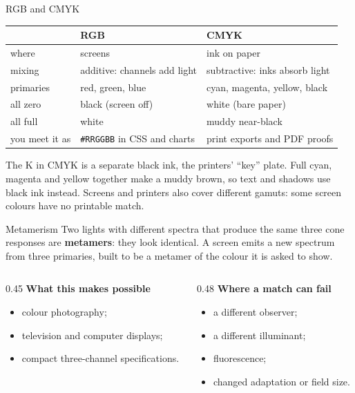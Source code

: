 \documentclass[aspectratio=169,11pt]{beamer}
\begin{document}
\begin{frame}{RGB and CMYK}
  \small
  \renewcommand{\arraystretch}{1.3}
  \begin{tabular}{@{}lll@{}}
    \toprule
     & \textbf{RGB} & \textbf{CMYK} \\
    \midrule
    where & screens & ink on paper \\
    mixing & additive: channels add light & subtractive: inks absorb light \\
    primaries & red, green, blue & cyan, magenta, yellow, black \\
    all zero & black (screen off) & white (bare paper) \\
    all full & white & muddy near-black \\
    you meet it as & \texttt{\#RRGGBB} in CSS and charts & print exports and PDF proofs \\
    \bottomrule
  \end{tabular}
  \vspace{0.8em}

  The K in CMYK is a separate black ink, the printers' ``key'' plate.
  Full cyan, magenta and yellow together make a muddy brown, so text and
  shadows use black ink instead. Screens and printers also cover
  different gamuts: some screen colours have no printable match.
\end{frame}

\begin{frame}{Metamerism}
  \small
  Two lights with different spectra that produce the same three cone
  responses are \textbf{metamers}: they look identical. A screen emits a
  new spectrum from three primaries, built to be a metamer of the colour
  it is asked to show.
  \vspace{0.8em}
  \begin{columns}[T]
    \begin{column}{0.45\textwidth}
      \textbf{What this makes possible}
      \begin{itemize}
        \item colour photography;
        \item television and computer displays;
        \item compact three-channel specifications.
      \end{itemize}
    \end{column}
    \begin{column}{0.48\textwidth}
      \textbf{Where a match can fail}
      \begin{itemize}
        \item a different observer;
        \item a different illuminant;
        \item fluorescence;
        \item changed adaptation or field size.
      \end{itemize}
    \end{column}
  \end{columns}
\end{frame}
\end{document}
